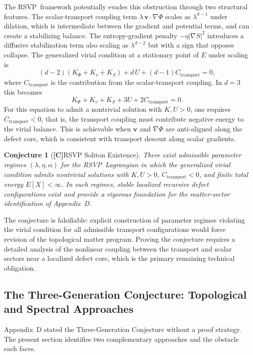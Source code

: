 \documentclass[12pt,a4paper]{article}
\newcommand{\claimC}{\textbf{[C]}\;}
\newtheorem{appconj}[defn]{Conjecture}
\newcommand{\RSVP}{\textrm{RSVP}}
\begin{document}
The \RSVP\ framework potentially evades this obstruction through two structural
features. The scalar-transport coupling term $\lambda\,\mathbf{v}\cdot\nabla\Phi$
scales as $\lambda^{d-1}$ under dilation, which is intermediate between the
gradient and potential terms, and can create a stabilizing balance. The
entropy-gradient penalty $-\eta|\nabla S|^2$ introduces a diffusive
stabilization term also scaling as $\lambda^{d-2}$ but with a sign that
opposes collapse. The generalized virial condition at a stationary point of $E$
under scaling is
\[
(d-2)(K_\Phi+K_v+K_S) + d\,U + (d-1)C_\mathrm{transport} = 0,
\]
where $C_\mathrm{transport}$ is the contribution from the scalar-transport
coupling. In $d=3$ this becomes
\[
K_\Phi + K_v + K_S + 3U + 2C_\mathrm{transport} = 0.
\]
For this equation to admit a nontrivial solution with $K,U>0$, one requires
$C_\mathrm{transport}<0$, that is, the transport coupling must contribute
negative energy to the virial balance. This is achievable when $\mathbf{v}$
and $\nabla\Phi$ are anti-aligned along the defect core, which is consistent
with transport descent along scalar gradients.

\begin{appconj}[\claimC RSVP Soliton Existence]
There exist admissible parameter regimes $(\lambda,\eta,\alpha)$ for the \RSVP\
Lagrangian in which the generalized virial condition admits nontrivial solutions
with $K,U>0$, $C_\mathrm{transport}<0$, and finite total energy $E[X]<\infty$.
In such regimes, stable localized recursive defect configurations exist and
provide a rigorous foundation for the matter-sector identification of
Appendix~D.
\end{appconj}

The conjecture is falsifiable: explicit construction of parameter regimes
violating the virial condition for all admissible transport configurations
would force revision of the topological matter program. Proving the conjecture
requires a detailed analysis of the nonlinear coupling between the transport
and scalar sectors near a localized defect core, which is the primary remaining
technical obligation.

\subsection{The Three-Generation Conjecture: Topological and Spectral Approaches}

Appendix~D stated the Three-Generation Conjecture without a proof strategy.
The present section identifies two complementary approaches and the obstacle
each faces.
\end{document}
